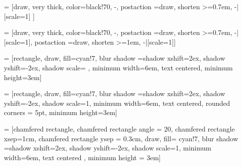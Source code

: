  = [draw, very thick, color=black!70, -, postaction ={draw, shorten >=0.7em, -{|[scale=1]}} ]

\newcommand{\HasComponent}[5]{
\path [barb] (#2) #3 (#4) node [midway, above, text width = 2cm, align= center, #5] (TextNode) {\contour{white}{#1}};
}

 = [draw, very thick, color=black!70, -, postaction ={draw, shorten >=0.7em, -{|[scale=1]}, postaction ={draw, shorten >=1em, -{|[scale=1]}}}]

\newcommand{\HasProperty}[5]{
\path [barb2] (#2) #3 (#4) node [midway, above, text width = 2cm, align= center, #5] (TextNode) {\contour{white}{#1}};
}



  
 = [rectangle, draw, fill=cyan!7, blur shadow ={shadow xshift=2ex, shadow yshift=-2ex, shadow scale=} , minimum width=6em, text centered, minimum height=3em]

\newcommand{\ObjectType}[5]{
    \ifthenelse{\equal{#4}{}}{\def \nd {2}}{\def \nd {#4}}
    
    \ifthenelse{\equal{#2}{} \AND \equal{#3}{}}{\def \posL {node distance}, \def \posR {\nd cm}}{\def \posL {#2}, \def \posR {#3}}
    
    \node [typeobjecttype, \posL = \posR, node distance = \nd cm, #5] (#1) {\emph{#1}}
}

 = [rectangle, draw, fill=cyan!7, blur shadow ={shadow xshift=2ex, shadow yshift=-2ex, shadow scale=1}, minimum width=6em, text centered, rounded corners = 5pt, minimum height=3em]

\newcommand{\VariableType}[5]{
    \ifthenelse{\equal{#4}{}}{\def \nd {2}}{\def \nd {#4}}
    
    \ifthenelse{\equal{#2}{} \AND \equal{#3}{}}{\def \posL {node distance}, \def \posR {\nd cm}}{\def \posL {#2}, \def \posR {#3}}
    \node [typevariabletype, \posL = \posR, node distance = \nd cm, #5] (#1) {\emph{#1}}
}

 = [chamfered rectangle, chamfered rectangle angle = 20, chamfered rectangle xsep=1cm, chamfered rectangle ysep = 0.3cm, draw, fill= cyan!7, blur shadow ={shadow xshift=2ex, shadow yshift=-2ex, shadow scale=1}, minimum width=6em, text centered , minimum height = 3em]

